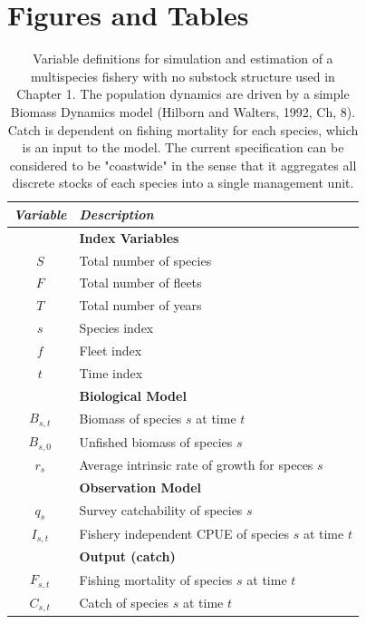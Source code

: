 \documentclass[]{scrartcl}
\author{}
\date{}
\begin{document}
\newpage

\section{Figures and Tables}\label{figures-and-tables}

\listoftables

\listoffigures

\newpage

\begin{table}[htbp]
\begin{center}
\caption{Variable definitions for simulation and estimation of a multispecies fishery with no substock structure used in Chapter 1. The population dynamics are driven by a simple Biomass Dynamics model (Hilborn and Walters, 1992, Ch, 8). Catch is dependent on fishing mortality for each species, which is an input to the model. The current specification can be considered to be "coastwide" in the sense that it aggregates all discrete stocks of each species into a single management unit.}\label{tab:Ch1spec}
\begin{tabular}{c|l}
\textit{Variable} & \textit{Description}  \\
\hline
& \textbf{ Index Variables} \\
\hline
$S$ & Total number of species \\
$F$ & Total number of fleets \\
$T$ & Total number of years \\
$s$ & Species index \\
$f$ & Fleet index \\
$t$ & Time index \\
\hline
& \textbf{ Biological Model} \\
\hline
$B_{s,t}$ & Biomass of species $s$ at time $t$ \\
$B_{s,0}$ & Unfished biomass of species $s$ \\
$r_{s}$ & Average intrinsic rate of growth for speces $s$ \\
\hline
& \textbf{ Observation Model} \\
\hline
$q_{s}$ & Survey catchability of species $s$ \\
$I_{s,t}$ & Fishery independent CPUE of species $s$ at time $t$ \\
\hline
& \textbf{ Output (catch) } \\
\hline
$F_{s,t}$ & Fishing mortality of species $s$ at time $t$ \\
$C_{s,t}$ & Catch of species $s$ at time $t$ \\

\end{tabular}
\end{center}
\end{table}
\end{document}
